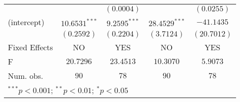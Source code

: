 \begin{table}[!ht]
\begin{center}
\begin{tabular}{l c c c c}
               &                 & $(0.0004)$      &                   & $(0.0255)$       \\
(intercept)    & $10.6531^{***}$ & $9.2595^{***}$  & $28.4529^{***}$   & $-41.1435$       \\
               & $(0.2592)$      & $(0.2204)$      & $(3.7124)$        & $(20.7012)$      \\
\hline
Fixed Effects  & NO              & YES             & NO                & YES              \\
F              & $20.7296$       & $23.4513$       & $10.3070$         & $5.9073$         \\
Num. obs.      & $90$            & $78$            & $90$              & $78$             \\
\hline
\multicolumn{5}{l}{\scriptsize{$^{***}p<0.001$; $^{**}p<0.01$; $^{*}p<0.05$}}
\end{tabular}
\label{tab:cw_atts}
\end{center}
\end{table}
